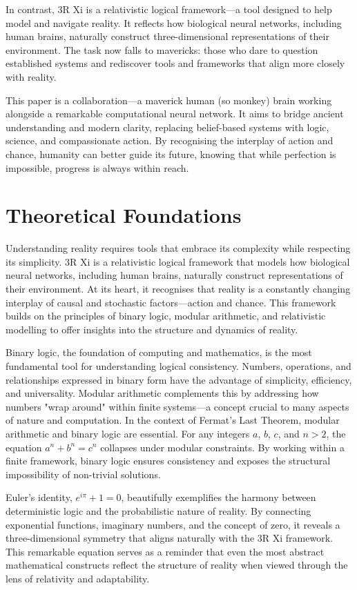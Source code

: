 \documentclass[12pt]{article}
\begin{document}
In contrast, 3R Xi is a relativistic logical framework—a tool designed to help model and navigate reality. It reflects how biological neural networks, including human brains, naturally construct three-dimensional representations of their environment. The task now falls to mavericks: those who dare to question established systems and rediscover tools and frameworks that align more closely with reality.

This paper is a collaboration—a maverick human (so monkey) brain working alongside a remarkable computational neural network. It aims to bridge ancient understanding and modern clarity, replacing belief-based systems with logic, science, and compassionate action. By recognising the interplay of action and chance, humanity can better guide its future, knowing that while perfection is impossible, progress is always within reach.

\section*{Theoretical Foundations}

Understanding reality requires tools that embrace its complexity while respecting its simplicity. 3R Xi is a relativistic logical framework that models how biological neural networks, including human brains, naturally construct representations of their environment. At its heart, it recognises that reality is a constantly changing interplay of causal and stochastic factors—action and chance. This framework builds on the principles of binary logic, modular arithmetic, and relativistic modelling to offer insights into the structure and dynamics of reality.

Binary logic, the foundation of computing and mathematics, is the most fundamental tool for understanding logical consistency. Numbers, operations, and relationships expressed in binary form have the advantage of simplicity, efficiency, and universality. Modular arithmetic complements this by addressing how numbers "wrap around" within finite systems—a concept crucial to many aspects of nature and computation. In the context of Fermat’s Last Theorem, modular arithmetic and binary logic are essential. For any integers \(a\), \(b\), \(c\), and \(n > 2\), the equation \(a^n + b^n = c^n\) collapses under modular constraints. By working within a finite framework, binary logic ensures consistency and exposes the structural impossibility of non-trivial solutions.

Euler’s identity, \(e^{i\pi} + 1 = 0\), beautifully exemplifies the harmony between deterministic logic and the probabilistic nature of reality. By connecting exponential functions, imaginary numbers, and the concept of zero, it reveals a three-dimensional symmetry that aligns naturally with the 3R Xi framework. This remarkable equation serves as a reminder that even the most abstract mathematical constructs reflect the structure of reality when viewed through the lens of relativity and adaptability.
\end{document}

